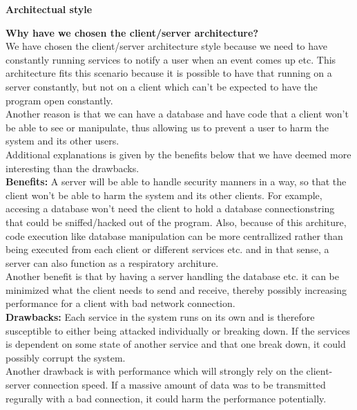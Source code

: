 \documentclass[main.tex]{subfiles}
\begin{document}
\textbf{Architectual style}

\textbf{Why have we chosen the client/server architecture?}\\
We have chosen the client/server architecture style because we need to have constantly running services to notify a user when an event comes up etc. This architecture fits this scenario because it is possible to have that running on a server constantly, but not on a client which can't be expected to have the program open constantly.\\
Another reason is that we can have a database and have code that a client won't be able to see or manipulate, thus allowing us to prevent a user to harm the system and its other users. \\
Additional explanations is given by the benefits below that we have deemed more interesting than the drawbacks.\\

\textbf{Benefits:}
A server will be able to handle security manners in a way, so that the client won't be able to harm the system and its other clients. For example, accesing a
database won't need the client to hold a database connectionstring that could be sniffed/hacked out of the program. Also, because of
this architure, code execution like database manipulation can be more centrallized rather than being executed from each client or different services etc. and in that sense, a server can also function as a respiratory architure.\\
Another benefit is that by having a server handling the database etc. it can be minimized what the client needs to send and receive, thereby possibly increasing performance for a client with bad network connection.\\

\textbf{Drawbacks:}
Each service in the system runs on its own and is therefore susceptible to either being attacked individually or breaking down.
If the services is dependent on some state of another service and that one break down, it could possibly corrupt the system.\\
Another drawback is with performance which will strongly rely on the client-server connection speed. If a massive amount of data was
to be transmitted regurally with a bad connection, it could harm the performance potentially.\\
\end{document}
